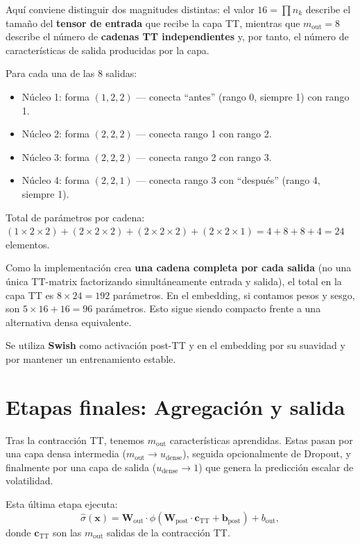 Aquí conviene distinguir dos magnitudes distintas: el valor $16 = \prod n_k$ describe el tamaño del \textbf{tensor de entrada} que recibe la capa TT, mientras que $m_{\text{out}} = 8$ describe el número de \textbf{cadenas TT independientes} y, por tanto, el número de características de salida producidas por la capa.

Para cada una de las 8 salidas:
\begin{itemize}
  \item Núcleo 1: forma $(1, 2, 2)$ — conecta ``antes'' (rango 0, siempre 1) con rango 1.
  \item Núcleo 2: forma $(2, 2, 2)$ — conecta rango 1 con rango 2.
  \item Núcleo 3: forma $(2, 2, 2)$ — conecta rango 2 con rango 3.
  \item Núcleo 4: forma $(2, 2, 1)$ — conecta rango 3 con ``después'' (rango 4, siempre 1).
\end{itemize}

Total de parámetros por cadena: $(1 \times 2 \times 2) + (2 \times 2 \times 2) + (2 \times 2 \times 2) + (2 \times 2 \times 1) = 4 + 8 + 8 + 4 = 24$ elementos.

Como la implementación crea \textbf{una cadena completa por cada salida} (no una única TT-matrix factorizando simultáneamente entrada y salida), el total en la capa TT es $8 \times 24 = 192$ parámetros. En el embedding, si contamos pesos y sesgo, son $5 \times 16 + 16 = 96$ parámetros. Esto sigue siendo compacto frente a una alternativa densa equivalente.

Se utiliza \textbf{Swish} como activación post-TT y en el embedding por su suavidad y por mantener un entrenamiento estable.

\section{Etapas finales: Agregación y salida}

Tras la contracción TT, tenemos $m_{\text{out}}$ características aprendidas. Estas pasan por una capa densa intermedia ($m_{\text{out}} \rightarrow u_{\text{dense}}$), seguida opcionalmente de Dropout, y finalmente por una capa de salida ($u_{\text{dense}} \rightarrow 1$) que genera la predicción escalar de volatilidad.

Esta última etapa ejecuta:
\begin{equation}
\hat{\sigma}(\mathbf{x}) = \mathbf{W}_{\text{out}} \cdot \phi(\mathbf{W}_{\text{post}} \cdot \mathbf{c}_{\text{TT}} + \mathbf{b}_{\text{post}}) + b_{\text{out}},
\label{eq:qi-final-output}
\end{equation}
donde $\mathbf{c}_{\text{TT}}$ son las $m_{\text{out}}$ salidas de la contracción TT.

